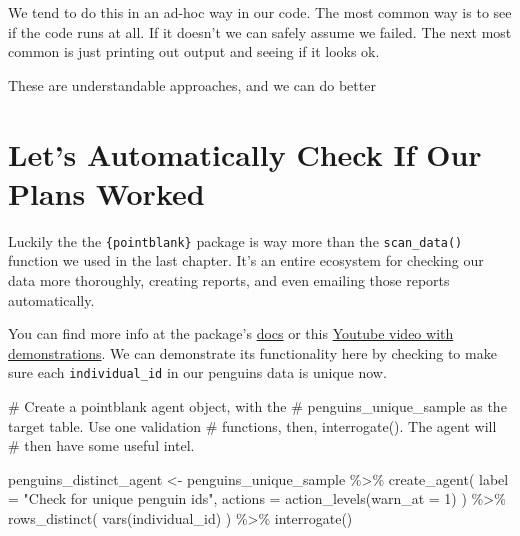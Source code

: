 \documentclass[
  letterpaper,
  DIV=11,
  numbers=noendperiod]{scrreprt}
\newenvironment{Shaded}{\begin{snugshade}}{\end{snugshade}}
\newcommand{\AttributeTok}[1]{\textcolor[rgb]{0.40,0.45,0.13}{#1}}
\newcommand{\CommentTok}[1]{\textcolor[rgb]{0.37,0.37,0.37}{#1}}
\newcommand{\DecValTok}[1]{\textcolor[rgb]{0.68,0.00,0.00}{#1}}
\newcommand{\FunctionTok}[1]{\textcolor[rgb]{0.28,0.35,0.67}{#1}}
\newcommand{\NormalTok}[1]{\textcolor[rgb]{0.00,0.23,0.31}{#1}}
\newcommand{\OtherTok}[1]{\textcolor[rgb]{0.00,0.23,0.31}{#1}}
\newcommand{\SpecialCharTok}[1]{\textcolor[rgb]{0.37,0.37,0.37}{#1}}
\newcommand{\StringTok}[1]{\textcolor[rgb]{0.13,0.47,0.30}{#1}}
\begin{document}
We tend to do this in an ad-hoc way in our code. The most common way is
to see if the code runs at all. If it doesn't we can safely assume we
failed. The next most common is just printing out output and seeing if
it looks ok.

These are understandable approaches, and we can do better

\hypertarget{lets-automatically-check-if-our-plans-worked}{%
\section{Let's Automatically Check If Our Plans
Worked}\label{lets-automatically-check-if-our-plans-worked}}

Luckily the the \texttt{\{pointblank\}} package is way more than the
\texttt{scan\_data()} function we used in the last chapter. It's an
entire ecosystem for checking our data more thoroughly, creating
reports, and even emailing those reports automatically.

You can find more info at the package's
\href{https://rstudio.github.io/pointblank/}{docs} or this
\href{https://www.youtube.com/watch?v=hxkTbnIXI-o}{Youtube video with
demonstrations}. We can demonstrate its functionality here by checking
to make sure each \texttt{individual\_id} in our penguins data is unique
now.

\begin{Shaded}
\begin{Highlighting}[]
\CommentTok{\# Create a pointblank \textasciigrave{}agent\textasciigrave{} object, with the}
\CommentTok{\# penguins\_unique\_sample as the target table. Use one validation}
\CommentTok{\# functions, then, \textasciigrave{}interrogate()\textasciigrave{}. The agent will}
\CommentTok{\# then have some useful intel.}

\NormalTok{penguins\_distinct\_agent }\OtherTok{\textless{}{-}} 
\NormalTok{  penguins\_unique\_sample }\SpecialCharTok{\%\textgreater{}\%}
  \FunctionTok{create\_agent}\NormalTok{(}
    \AttributeTok{label =} \StringTok{"Check for unique penguin ids"}\NormalTok{,}
    \AttributeTok{actions =} \FunctionTok{action\_levels}\NormalTok{(}\AttributeTok{warn\_at =} \DecValTok{1}\NormalTok{)}
\NormalTok{  ) }\SpecialCharTok{\%\textgreater{}\%}
  \FunctionTok{rows\_distinct}\NormalTok{(}
    \FunctionTok{vars}\NormalTok{(individual\_id)}
\NormalTok{  ) }\SpecialCharTok{\%\textgreater{}\%}
  \FunctionTok{interrogate}\NormalTok{()}
\end{Highlighting}
\end{Shaded}
\end{document}
